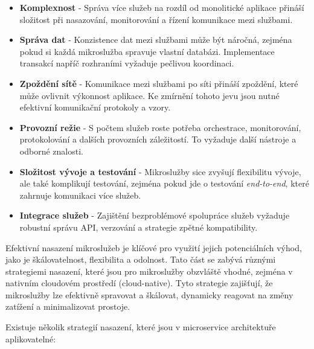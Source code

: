 \begin{itemize}

\item \textbf{Komplexnost} - Správa více služeb na rozdíl od monolitické aplikace přináší složitost při nasazování, monitorování a řízení komunikace mezi službami.

\item \textbf{Správa dat} - Konzistence dat mezi službami může být náročná, zejména pokud si každá mikroslužba spravuje vlastní databázi. Implementace transakcí napříč rozhraními vyžaduje pečlivou koordinaci.

\item \textbf{Zpoždění sítě} - Komunikace mezi službami po síti přináší zpoždění, které může ovlivnit výkonnost aplikace. Ke zmírnění tohoto jevu jsou nutné efektivní komunikační protokoly a vzory.

\item \textbf{Provozní režie} - S počtem služeb roste potřeba orchestrace, monitorování, protokolování a dalších provozních záležitostí. To vyžaduje další nástroje a odborné znalosti.

\item \textbf{Složitost vývoje a testování} - Mikroslužby sice zvyšují flexibilitu vývoje, ale také komplikují testování, zejména pokud jde o testování \emph{end-to-end}, které zahrnuje komunikaci více služeb.

\item \textbf{Integrace služeb} - Zajištění bezproblémové spolupráce služeb vyžaduje robustní správu API, verzování a strategie zpětné kompatibility.

\end{itemize}


Efektivní nasazení mikroslužeb je klíčové pro využití jejich potenciálních výhod, jako je škálovatelnost, flexibilita a odolnost. Tato část se zabývá různými strategiemi nasazení, které jsou pro mikroslužby obzvláště vhodné, zejména v nativním cloudovém prostředí (cloud-native). Tyto strategie zajišťují, že mikroslužby lze efektivně spravovat a škálovat, dynamicky reagovat na změny zatížení a minimalizovat prostoje. \cite{Williams2023}


Existuje několik strategií nasazení, které jsou v microservice architektuře aplikovatelné:

